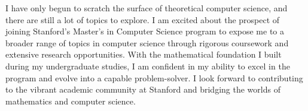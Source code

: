 \documentclass[12pt]{article}
\begin{document}
I have only begun to scratch the surface of theoretical computer science, and there are still a lot
of topics to explore. I am excited about the prospect of joining Stanford's Master's in Computer
Science program to expose me to a broader range of topics in computer science through rigorous
coursework and extensive research opportunities. With the mathematical foundation I built during my
undergraduate studies, I am confident in my ability to excel in the program and evolve into a
capable problem-solver. I look forward to contributing to the vibrant academic community at Stanford
and bridging the worlds of mathematics and computer science.

\newpage



\end{document}
